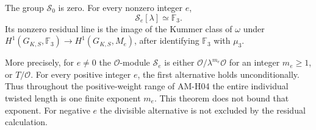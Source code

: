 \begin{theorem}
\label{AC-G22}
The group $\mathcal S_0$ is zero.  For every nonzero integer $e$,
\[
 \mathcal S_e[\lambda]\simeq\mathbb F_3.
\]
Its nonzero residual line is the image of the Kummer class of
$\omega$ under
$H^1(G_{K,S},\mathbb F_3)\to H^1(G_{K,S},M_e)$, after identifying
$\mathbb F_3$ with $\mu_3$.

More precisely, for $e\ne0$ the $\mathcal O$-module $\mathcal S_e$
is either $\mathcal O/\lambda^{m_e}\mathcal O$ for an integer
$m_e\geq1$, or $T/\mathcal O$.  For every positive integer $e$,
the first alternative holds unconditionally.  Thus throughout the
positive-weight range of AM-H04 the entire individual twisted
length is one finite exponent $m_e$.  This theorem does not bound
that exponent.  For negative $e$ the divisible alternative is not
excluded by the residual calculation.
\end{theorem}
